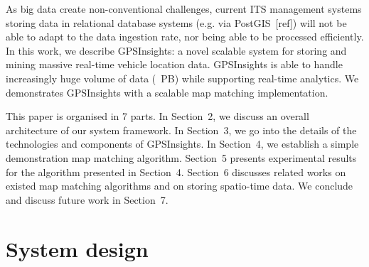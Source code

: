 \documentclass{acm_proc_article-sp}
\begin{document}
As big data create non-conventional challenges, current ITS management systems storing data in relational database systems (e.g. via PostGIS~[ref]) will not be able to adapt to the data ingestion rate, nor being able to be processed efficiently. In this work, we describe GPSInsights: a novel scalable system for storing and mining massive real-time vehicle location data. GPSInsights is able to handle increasingly huge volume of data (~PB) while supporting real-time analytics. We demonstrates GPSInsights with a scalable map matching implementation. 

This paper is organised in 7 parts. In Section~2, we discuss an overall architecture of our system framework. In Section~3, we go into the details of the technologies and components of GPSInsights. In Section~4, we establish a simple demonstration map matching algorithm. Section~5 presents experimental results for the algorithm presented in Section~4. Section~6 discusses related works on existed map matching algorithms and on storing spatio-time data. We conclude and discuss future work in Section~7.
	
\section{System design} 
	



\end{document}
